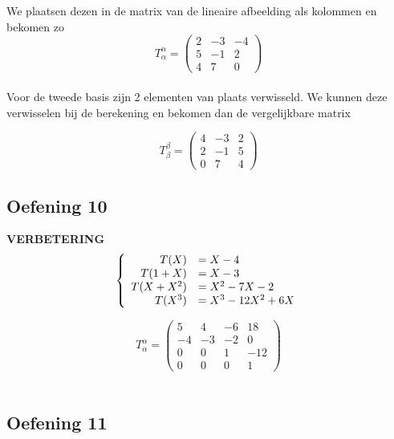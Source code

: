 \documentclass[lineaire_algebra_oplossingen.tex]{subfiles}
\begin{document}
We plaatsen dezen in de matrix van de lineaire afbeelding als kolommen en bekomen zo\\

\[
T^{\alpha}_{\alpha} =
\begin{pmatrix}
2 & -3 & -4\\
5 & -1 & 2\\
4 & 7 & 0
\end{pmatrix}
\]\\

Voor de tweede basis zijn 2 elementen van plaats verwisseld. We kunnen deze verwisselen bij de berekening en bekomen dan de vergelijkbare matrix

\[
T^{\beta}_{\beta} =
\begin{pmatrix}
4 & -3 & 2\\
2 & -1 & 5\\
0 & 7 & 4
\end{pmatrix}
\]


\subsection{Oefening 10}
\textbf{VERBETERING}
\[
\left\lbrace
\begin{array}{r l}
T(X) &= X-4\\
T(1+X) &= X-3\\
T(X+X^2) &= X^2-7X-2\\
T(X^3) &= X^3-12X^2+6X\\
\end{array}
\right.
\]

\[
T^{\alpha}_{\alpha} =
\begin{pmatrix}
5 & 4 & -6 & 18\\
-4 & -3 & -2 & 0\\
0 & 0 & 1 & -12\\
0 & 0 & 0 & 1
\end{pmatrix}
\]\\

\subsection{Oefening 11}
\end{document}
